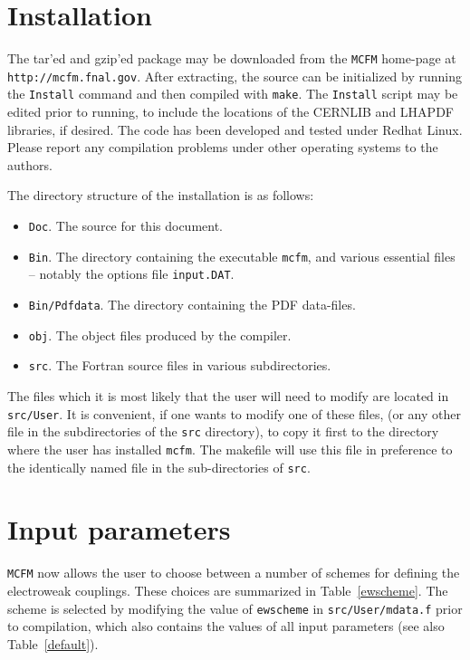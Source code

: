 \documentclass[12pt]{article}
\begin{document}
\section{Installation}

The tar'ed and gzip'ed package may be downloaded from
the {\tt MCFM} home-page at {\tt http://mcfm.fnal.gov}.
After extracting, the source can be initialized by running the
{\tt Install} command and then compiled with {\tt make}. The
{\tt Install} script may be edited prior to running, to include
the locations of the CERNLIB and LHAPDF libraries, if desired.
The code has been developed and tested under Redhat Linux. Please report
any compilation problems under other operating systems to the authors.

The directory structure of the installation is as follows:
\begin{itemize}
\item {\tt Doc}. The source for this document.
\item {\tt Bin}. The directory containing the executable {\tt mcfm},
and various essential files -- notably the options file {\tt input.DAT}.
\item {\tt Bin/Pdfdata}. The directory containing the PDF data-files.
\item {\tt obj}. The object files produced by the compiler. 
\item {\tt src}. The Fortran source files in various subdirectories.
\end{itemize}
The files which it is most likely that the user will need to modify
are located in {\tt src/User}. It is convenient, if one wants to 
modify one of these files, (or any other file in the subdirectories of the 
{\tt src} directory),
to copy it first to the directory where the user has installed {\tt mcfm}.
The makefile will use this file in preference to the identically named
file in the sub-directories of {\tt src}.
 
\section{Input parameters}

{\tt MCFM} now allows the user to choose between a number of schemes
for defining the electroweak couplings. These choices are summarized
in Table~\ref{ewscheme}. The scheme is selected by modifying the
value of {\tt ewscheme} in {\tt src/User/mdata.f} prior to compilation, 
which also contains
the values of all input parameters (see also Table~\ref{default}).
\end{document}
